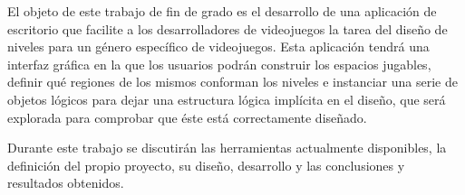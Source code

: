 El objeto de este trabajo de fin de grado es el desarrollo de una aplicación de escritorio que facilite a los desarrolladores de videojuegos la tarea del diseño de niveles para un género específico de videojuegos. Esta aplicación tendrá una interfaz gráfica en la que los usuarios podrán construir los espacios jugables, definir qué regiones de los mismos conforman los niveles e instanciar una serie de objetos lógicos para dejar una estructura lógica implícita en el diseño, que será explorada para comprobar que éste está correctamente diseñado.

Durante este trabajo se discutirán las herramientas actualmente disponibles, la definición del propio proyecto, su diseño, desarrollo y las conclusiones y resultados obtenidos.



